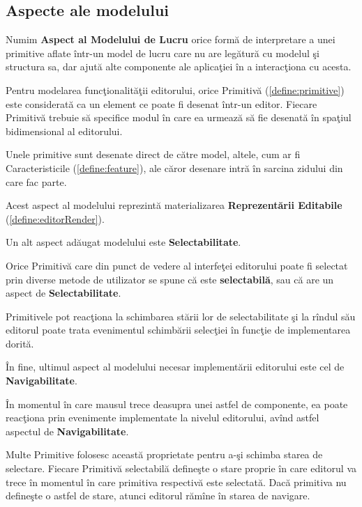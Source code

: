 \subsection{Aspecte ale modelului}

\begin{definition}
\label{define:model-aspect}
Numim \textbf{Aspect al Modelului de Lucru} orice formă de interpretare a unei 
primitive aflate într-un model de lucru care nu are legătură cu modelul şi 
structura sa, dar ajută alte componente ale aplicaţiei în a interacţiona cu 
acesta.
\end{definition}

Pentru modelarea funcţionalităţii editorului, orice Primitivă 
(\ref{define:primitive}) este considerată ca un element ce poate fi desenat 
într-un editor. Fiecare Primitivă trebuie să specifice modul în care ea urmează 
să fie desenată în spaţiul bidimensional al editorului.

Unele primitive sunt desenate direct de către model, altele, cum ar fi 
Caracteristicile (\ref{define:feature}), ale căror desenare intră în 
sarcina zidului din care fac parte.

Acest aspect al modelului reprezintă materializarea \textbf{Reprezentării 
Editabile} (\ref{define:editorRender}).

Un alt aspect adăugat modelului este \textbf{Selectabilitate}.

\begin{definition}
\label{define:selectable}
Orice Primitivă care din punct de vedere al interfeţei editorului poate fi 
selectat prin diverse metode de utilizator se spune că este 
\textbf{selectabilă}, sau că are un aspect de \textbf{Selectabilitate}.
\end{definition}

Primitivele pot reacţiona la schimbarea stării lor de selectabilitate şi la 
rîndul său editorul poate trata evenimentul schimbării selecţiei în funcţie de 
implementarea dorită.

În fine, ultimul aspect al modelului necesar implementării editorului este cel 
de \textbf{Navigabilitate}.

\begin{definition}
\label{define:hoverable}
În momentul în care mausul trece deasupra unei 
astfel de componente, ea poate reacţiona prin evenimente implementate la 
nivelul editorului, avînd astfel aspectul de \textbf{Navigabilitate}.
\end{definition}

Multe Primitive folosesc această proprietate pentru a-şi schimba starea de 
selectare. Fiecare Primitivă selectabilă defineşte o stare proprie în care
editorul va trece în momentul în care primitiva respectivă este selectată. Dacă
primitiva nu defineşte o astfel de stare, atunci editorul rămîne în starea de
navigare.


